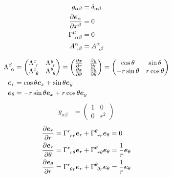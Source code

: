 \documentclass[uplatex,dvipdfmx,a4paper,11pt]{jlreq}
\newcommand{\ee}{\bm{e}}
\theoremstyle{definition}
\begin{document}
\begin{example}[デカルト座標]
  \begin{align}
    g_{\alpha\beta}             & = \delta_{\alpha\beta} \\
    \diffp{\ee_\alpha}{x^\beta} & = 0                    \\
    \Gamma^\mu_{\ \alpha\beta}  & = 0                    \\
    A^\alpha_{\ ;\beta}         & = A^\alpha_{\ ,\beta}
  \end{align}
\end{example}
\begin{example}[極座標]
  \begin{align}
    \Lambda_{\ \alpha}^\beta & =
    \begin{pmatrix}
      \Lambda_{\ r}^{x}      & \Lambda_{\ r}^{y}      \\
      \Lambda_{\ \theta}^{x} & \Lambda_{\ \theta}^{y}
    \end{pmatrix}
    =
    \begin{pmatrix}
      \diffp{x}{r}      & \diffp{y}{r}      \\
      \diffp{x}{\theta} & \diffp{y}{\theta}
    \end{pmatrix}
    =
    \begin{pmatrix}
      \cos\theta   & \sin\theta  \\
      -r\sin\theta & r\cos\theta
    \end{pmatrix}                                        \\
    \ee_r                    & = \cos\theta\ee_x + \sin\theta\ee_y    \\
    \ee_\theta               & = -r\sin\theta\ee_x + r\cos\theta\ee_y
  \end{align}
  \begin{align}
    g_{\alpha\beta} & = \begin{pmatrix}
                          1 & 0   \\
                          0 & r^2
                        \end{pmatrix}
  \end{align}
  \begin{align}
    \diffp{\ee_r}{r}           & = \Gamma^{r}_{\ rr}\ee_r + \Gamma^{\theta}_{\ rr}\ee_\theta = 0                                 \\
    \diffp{\ee_r}{\theta}      & = \Gamma^{r}_{\ r\theta}\ee_r + \Gamma^{\theta}_{\ r\theta}\ee_\theta = \frac{1}{r}\ee_\theta   \\
    \diffp{\ee_\theta}{r}      & = \Gamma^{r}_{\ \theta r}\ee_r + \Gamma^{\theta}_{\ \theta r}\ee_\theta = \frac{1}{r}\ee_\theta \\

\end{align}
\end{example}
\end{document}
